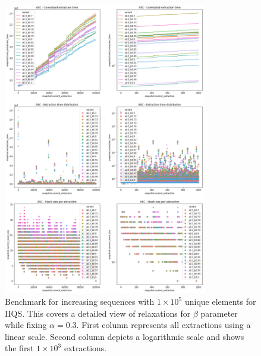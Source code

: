 \begin{figure}[p]
    \centering
    \includegraphics[width=0.79\textwidth]{./fragments/04_experimental_execution/images/04_alphabeta_detail_increasing_right.png}
    \caption{Benchmark for increasing sequences with $1\times10^5$ unique elements for IIQS. This covers a detailed view of relaxations for $\beta$ parameter while fixing $\alpha=0.3$.  First column represents all extractions using a linear scale. Second column depicts a logarithmic scale and shows the first $1\times10^3$ extractions. }
    \label{FIG:05_ALPHABETA_BENCHMARK_ASC_RIGHT}
\end{figure}

